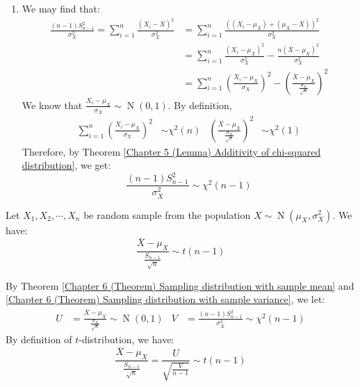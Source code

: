 \documentclass{huhtakm-template-book}
\DeclareMathOperator{\N}{N}
\begin{document}
\begin{proofing}
	\begin{enumerate}
		\item We may find that:
		\begin{align*}
			\frac{(n-1)S_{n-1}^{2}}{\sigma_{X}^{2}}=\sum_{i=1}^{n}\frac{(X_{i}-\overline{X})^{2}}{\sigma_{X}^{2}}&=\sum_{i=1}^{n}\frac{((X_{i}-\mu_{X})+(\mu_{X}-\overline{X}))^{2}}{\sigma_{X}^{2}}\\
			&=\sum_{i=1}^{n}\frac{(X_{i}-\mu_{X})^{2}}{\sigma_{X}^{2}}-\frac{n(\overline{X}-\mu_{X})^{2}}{\sigma_{X}^{2}}\\
			&=\sum_{i=1}^{n}\left(\frac{X_{i}-\mu_{X}}{\sigma_{X}}\right)^{2}-\left(\frac{\overline{X}-\mu_{X}}{\frac{\sigma_{X}}{\sqrt{n}}}\right)^{2}
		\end{align*}
		We know that $\frac{X_{i}-\mu_{X}}{\sigma_{X}}\sim\N(0,1)$. By definition,
		\begin{align*}
			\sum_{i=1}^{n}\left(\frac{X_{i}-\mu_{X}}{\sigma_{X}}\right)^{2}&\sim\chi^{2}(n) & \left(\frac{\overline{X}-\mu_{X}}{\frac{\sigma_{X}}{\sqrt{n}}}\right)^{2}&\sim\chi^{2}(1)
		\end{align*} 
		Therefore, by Theorem \ref{Chapter 5 (Lemma) Additivity of chi-squared distribution}, we get:
		\begin{equation*}
			\frac{(n-1)S_{n-1}^{2}}{\sigma_{X}^{2}}\sim\chi^{2}(n-1)
		\end{equation*}
	\end{enumerate}
\end{proofing}
\begin{thm}
	Let $X_{1},X_{2},\cdots,X_{n}$ be random sample from the population $X\sim\N(\mu_{X},\sigma_{X}^{2})$. We have:
	\begin{equation*}
		\frac{\overline{X}-\mu_{X}}{\frac{S_{n-1}}{\sqrt{n}}}\sim t(n-1)
	\end{equation*}
\end{thm}
\begin{proofing}
	By Theorem \ref{Chapter 6 (Theorem) Sampling distribution with sample mean} and \ref{Chapter 6 (Theorem) Sampling distribution with sample variance}, we let:
	\begin{align*}
		U&=\frac{\overline{X}-\mu_{X}}{\frac{\sigma_{X}}{\sqrt{n}}}\sim\N(0,1) & V&=\frac{(n-1)S_{n-1}^{2}}{\sigma_{X}^{2}}\sim\chi^{2}(n-1)
	\end{align*}
	By definition of $t$-distribution, we have:
	\begin{equation*}
		\frac{\overline{X}-\mu_{X}}{\frac{S_{n-1}}{\sqrt{n}}}=\frac{U}{\sqrt{\frac{V}{n-1}}}\sim t(n-1)
	\end{equation*}
\end{proofing}
\end{document}
